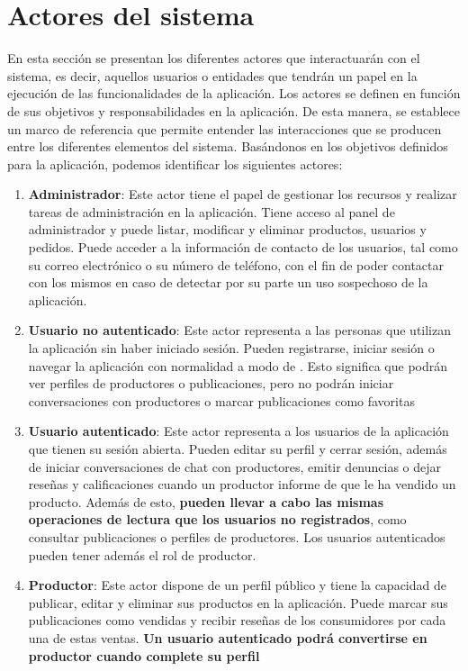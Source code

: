 
\section{Actores del sistema}\label{sec:actores-sistema}
En esta sección se presentan los diferentes actores que interactuarán con el sistema, es decir, aquellos usuarios o entidades que tendrán un papel en la ejecución de las funcionalidades de la aplicación. Los actores se definen en función de sus objetivos y responsabilidades en la aplicación. De esta manera, se establece un marco de referencia que permite entender las interacciones que se producen entre los diferentes elementos del sistema. Basándonos en los objetivos definidos para la aplicación, podemos identificar los siguientes actores:

\begin{enumerate}[label=ACT-\protect\twodigits{\arabic*}:, align=left, leftmargin=*]

    \item \textbf{Administrador}: Este actor tiene el papel de gestionar los recursos y realizar tareas de administración en la aplicación. Tiene acceso al panel de administrador y puede listar, modificar y eliminar productos, usuarios y pedidos. Puede acceder a la información de contacto de los usuarios, tal como su correo electrónico o su número de teléfono, con el fin de poder contactar con los mismos en caso de detectar por su parte un uso sospechoso de la aplicación.

    \item \textbf{Usuario no autenticado}: Este actor representa a las personas que utilizan la aplicación sin haber iniciado sesión. Pueden registrarse, iniciar sesión o navegar la aplicación con normalidad a modo de . Esto significa que podrán ver perfiles de productores o publicaciones, pero no podrán iniciar conversaciones con productores o marcar publicaciones como favoritas
    
    \item \textbf{Usuario autenticado}: Este actor representa a los usuarios de la aplicación que tienen su sesión abierta. Pueden editar su perfil y cerrar sesión, además de iniciar conversaciones de chat con productores, emitir denuncias o dejar reseñas y calificaciones cuando un productor informe de que le ha vendido un producto. Además de esto, \textbf{pueden llevar a cabo las mismas operaciones de lectura que los usuarios no registrados}, como consultar publicaciones o perfiles de productores. Los usuarios autenticados pueden tener además el rol de productor.
    
    \item \textbf{Productor}: Este actor dispone de un perfil público y tiene la capacidad de publicar, editar y eliminar sus productos en la aplicación. Puede marcar sus publicaciones como vendidas y recibir reseñas de los consumidores por cada una de estas ventas. \textbf{Un usuario autenticado podrá convertirse en productor cuando complete su perfil}

\end{enumerate}